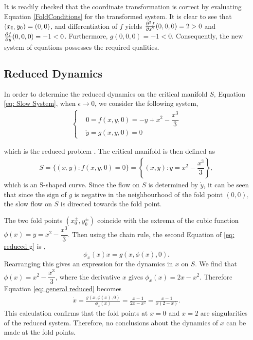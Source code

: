It is readily checked that the coordinate transformation is correct by evaluating Equation \ref{FoldConditions} for the transformed system. It is clear to see that $(x_0,y_0)=(0,0)$, and differentiation of $f$ yields $\pd[2]{f}{x}(0,0,0)=2>0$ and $\pd{f}{y}(0,0,0)=-1<0$. Furthermore, $g(0,0,0) = -1 <0$. Consequently, the new system of equations possesses the required qualities.

\subsection{Reduced Dynamics}

In order to determine the reduced dynamics on the critical manifold $S$, Equation \ref{eq: Slow System}, when $\epsilon\to 0$, we consider the following system,
\begin{align}
\begin{cases}
&0=f(x,y,0)=-y+x^2-\dfrac{x^3}{3}\\
&\dot{y}=g(x,y,0)=0 \label{eq: reduced g}
\end{cases}
\end{align}

which is the reduced problem \citep{Kuehn}. 
The critical manifold is then defined as 
\begin{align}
S= \{ (x,y) : f(x,y,0)=0 \} = \left\{ (x,y) : y = x^2-\dfrac{x^3}{3}\right \},
\end{align}
which is an S-shaped curve. 
Since the flow on $S$ is determined by $\dot{y}$, it can be seen that since the sign of $g$ is negative in the neighbourhood of the fold point $(0,0)$, the slow flow on $S$ is directed towards the fold point.

The two  fold points $(x_0^\pm,y_0^\pm)$ coincide with the extrema of the cubic function  $ \phi(x) = y = x^2-\dfrac{x^3}{3}$.
Then using the chain rule, the second Equation of \ref{eq: reduced g} is  \citep{krupa2001},
\begin{equation}
\phi_x(x)\dot{x}=g(x,\phi(x),0).
\label{eq: general reduced}
\end{equation}
Rearranging this gives an expression for the dynamics in $x$ on $S$.
We find that $\phi(x)=x^2-\dfrac{x^3}{3}$, where the derivative \wrt $x$ gives $\phi_x(x)=2x-x^2$.
Therefore Equation \ref{eq: general reduced} becomes 
\begin{align*}
\dot{x} = \frac{g(x,\phi(x),0)}{ \phi_x(x)} = \frac{ x-1}{2x-x^2} =\frac{ x-1}{x(2-x)}.
\end{align*}
This calculation confirms that the fold points at $x=0$ and $x=2$ are singularities of the reduced system. Therefore, no conclusions about the dynamics of $x$ can be made at the fold points. 

